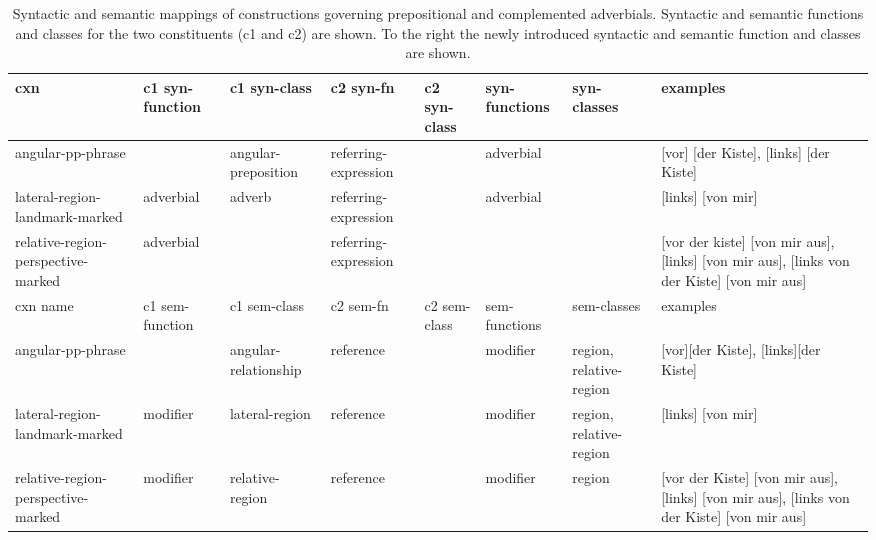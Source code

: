 \begin{table}
\begin{centering}
\begin{footnotesize}
\begin{tabular}{| p{1.6cm} || p{1.6cm} | p{1.6cm}  || p{1.6cm} | p{1.6cm}  || p{1.4cm} | p{1.4cm}  || p{3.5cm} |}
\hline
cxn &  c1 syn-function & c1 syn-class &  c2 syn-fn & c2 syn-class  & syn-functions & syn-classes & examples \\ \hline\hline
angular-pp-phrase & & angular-preposition & referring-expression & & adverbial & &[vor] [der Kiste], [links] [der Kiste]
\\ \hline  
lateral-region-landmark-marked  & adverbial &adverb & referring-expression & & adverbial & & [links] [von mir] 
\\ \hline  
relative-region-perspective-marked  &adverbial & &referring-expression & & & &
[vor der kiste] [von mir aus], [links] [von mir aus], [links von der Kiste] [von mir aus] 
\\ 
\hline
\hline
cxn name &  c1 sem-function & c1 sem-class &  c2 sem-fn & c2 sem-class  & sem-functions & sem-classes & examples \\ \hline\hline
angular-pp-phrase & & angular-relationship & reference & & modifier & region, relative-region & [vor][der Kiste], [links][der Kiste]
\\ \hline
lateral-region-landmark-marked  & modifier & lateral-region & reference & & modifier & region, relative-region & [links] [von mir] 
\\ \hline
relative-region-perspective-marked  & modifier & relative-region &reference & &modifier & region &
[vor der Kiste] [von mir aus],[links] [von mir aus], [links von der Kiste] [von mir aus] 
\\ \hline
\end{tabular}
\end{footnotesize}
\end{centering}
\label{t:landmark-perspective-cxns}
\caption[Syntactic and semantic mappings of constructions]{
Syntactic and semantic mappings of constructions 
governing prepositional and complemented adverbials. Syntactic and semantic
functions and classes for the two constituents (c1 and c2) are shown. To the right
the newly introduced syntactic and semantic function and classes are shown.}
\end{table}

